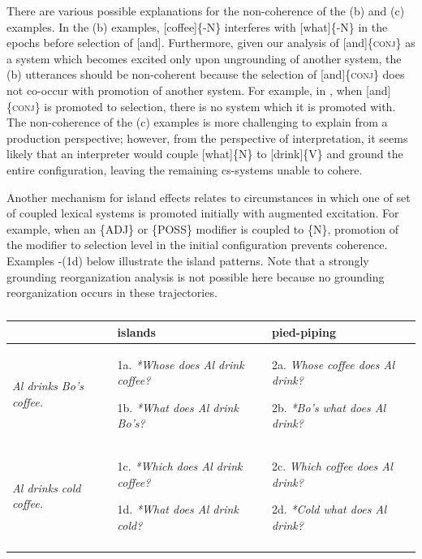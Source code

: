   There are various possible explanations for the non-coherence of the (b) and (c) examples. In the (b) examples, [coffee]\{-N\} interferes with [what]\{-N\} in the epochs before selection of [and]. Furthermore, given our analysis of [and]\{\textsc{conj}\} as a system which becomes excited only upon ungrounding of another system, the (b) utterances should be non-coherent because the selection of [and]\{\textsc{conj}\} does not co-occur with promotion of another system. For example, in , when [and]\{\textsc{conj}\} is promoted to selection, there is no system which it is promoted with. The non-coherence of the (c) examples is more challenging to explain from a production perspective; however, from the perspective of interpretation, it seems likely that an interpreter would couple [what]\{N\} to [drink]\{V\} and ground the entire configuration, leaving the remaining cs-systems unable to cohere.

Another mechanism for island effects relates to circumstances in which one of set of coupled lexical systems is promoted initially with augmented excitation. For example, when an \{ADJ\} or \{POSS\} modifier is coupled to \{N\}, promotion of the modifier to selection level in the initial configuration prevents coherence. Examples -(1d) below illustrate the island patterns. Note that a strongly grounding reorganization analysis is not possible here because no grounding reorganization occurs in these trajectories.

\begin{table}
\begin{tabularx}{\textwidth}{QQQ} 
\lsptoprule
& islands & pied-piping\\
\midrule
\textit{Al drinks Bo’s coffee.} & 1a.  \textit{*Whose does Al drink coffee?}

1b.  \textit{*What does Al drink Bo’s?} & 2a.  \textit{Whose coffee does Al drink?}

2b.  \textit{*Bo’s what does Al drink?}\\
\textit{Al drinks cold coffee.} & 1c.  \textit{*Which does Al drink coffee?}

1d.  \textit{*What does Al drink cold?} & 2c.  \textit{Which coffee does Al drink?}

2d.  \textit{*Cold what does Al drink?}\\
\lspbottomrule
\end{tabularx}
\caption{\missingcaption}\label{tab:key:}
\end{table}

